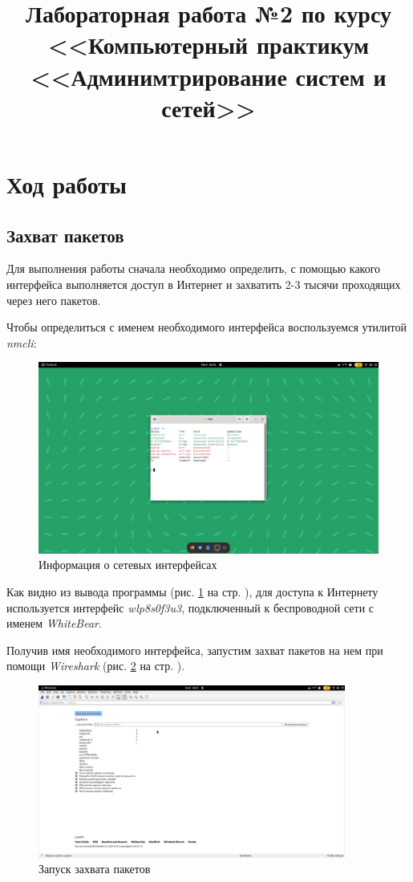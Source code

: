 \documentclass[a4paper]{article}
\title{
  Лабораторная работа №2 по курсу \\
  <<Компьютерный практикум <<Админимтрирование систем и сетей>>  
}
\begin{document}
  \templatedtitlepage
  
  \toc
  \section{Ход работы}

  \subsection{Захват пакетов}

  Для выполнения работы сначала необходимо определить, с помощью какого интерфейса выполняется
  доступ в Интернет и захватить 2-3 тысячи проходящих через него пакетов.
  
  Чтобы определиться с именем необходимого интерфейса воспользуемся утилитой \textit{nmcli}:
    
  \begin{figure}[H]
    \centering
    \includegraphics[width=1.0\textwidth]{02_0001}
    \caption{Информация о сетевых интерфейсах}
    \label{img:0001}
  \end{figure}

  Как видно из вывода программы (рис. \ref{img:0001} на стр. \pageref{img:0001}), для 
  доступа к Интернету используется интерфейс \textit{wlp8s0f3u3}, подключенный 
  к беспроводной сети с именем \textit{WhiteBear}.

  Получив имя необходимого интерфейса, запустим захват пакетов на нем при помощи
  \textit{Wireshark} (рис. \ref{img:0002} на стр. \pageref{img:0002}).

  \begin{figure}[H]
    \centering
    \includegraphics[width=0.9\textwidth]{02_0002}
    \caption{Запуск захвата пакетов}
    \label{img:0002}
  \end{figure}
\end{document}
